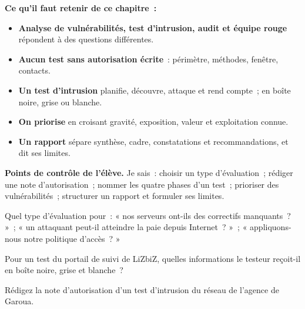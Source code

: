 \separateur

\begin{boxresume}
\textbf{Ce qu'il faut retenir de ce chapitre~:}
\begin{itemize}
    \item \textbf{Analyse de vulnérabilités, test d'intrusion, audit et
          équipe rouge} répondent à des questions différentes.
    \item \textbf{Aucun test sans autorisation écrite}~: périmètre,
          méthodes, fenêtre, contacts.
    \item \textbf{Un test d'intrusion} planifie, découvre, attaque et rend
          compte~; en boîte noire, grise ou blanche.
    \item \textbf{On priorise} en croisant gravité, exposition, valeur et
          exploitation connue.
    \item \textbf{Un rapport} sépare synthèse, cadre, constatations et
          recommandations, et dit ses limites.
\end{itemize}
\end{boxresume}

\begin{boxinfo}
\textbf{Points de contrôle de l'élève.} Je sais~: choisir un type
d'évaluation~; rédiger une note d'autorisation~; nommer les quatre phases
d'un test~; prioriser des vulnérabilités~; structurer un rapport et
formuler ses limites.
\end{boxinfo}

\bigskip

\begin{boxexo}[title={\ding{45}\quad Exercice~21.1. Quel type~? \niveaubase}]
Quel type d'évaluation pour~: « nos serveurs ont-ils des correctifs
manquants~? »~; « un attaquant peut-il atteindre la paie depuis
Internet~? »~; « appliquons-nous notre politique d'accès~? »
\end{boxexo}

\begin{boxexo}[title={\ding{45}\quad Exercice~21.2. Les boîtes \niveaubase}]
Pour un test du portail de suivi de LiZbiZ, quelles informations le
testeur reçoit-il en boîte noire, grise et blanche~?
\end{boxexo}

\begin{boxexo}[title={\ding{45}\quad Exercice~21.3. La note \niveaumoyen}]
Rédigez la note d'autorisation d'un test d'intrusion du réseau de
l'agence de Garoua.
\end{boxexo}

